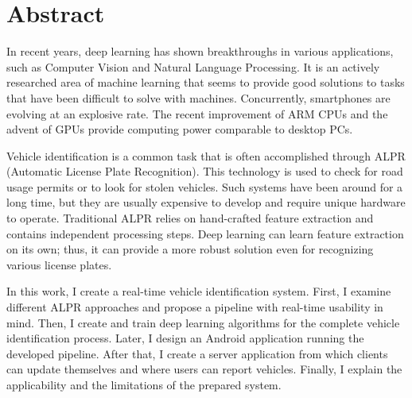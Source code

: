 \chapter*{Abstract}

In recent years, deep learning has shown breakthroughs in various applications, such as Computer Vision and Natural Language Processing. It is an actively researched area of machine learning that seems to provide good solutions to tasks that have been difficult to solve with machines. Concurrently, smartphones are evolving at an explosive rate. The recent improvement of ARM CPUs and the advent of GPUs provide computing power comparable to desktop PCs.

Vehicle identification is a common task that is often accomplished through ALPR (Automatic License Plate Recognition). This technology is used to check for road usage permits or to look for stolen vehicles. Such systems have been around for a long time, but they are usually expensive to develop and require unique hardware to operate. Traditional ALPR relies on hand-crafted feature extraction and contains independent processing steps. Deep learning can learn feature extraction on its own; thus, it can provide a more robust solution even for recognizing various license plates.

In this work, I create a real-time vehicle identification system. First, I examine different ALPR approaches and propose a pipeline with real-time usability in mind. Then, I create and train deep learning algorithms for the complete vehicle identification process. Later, I design an Android application running the developed pipeline. After that, I create a server application from which clients can update themselves and where users can report vehicles. Finally, I explain the applicability and the limitations of the prepared system.

\vfill
\selectthesislanguage

\setcounter{romanPage}{\value{page}}
